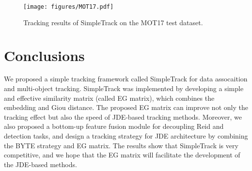 \documentclass[runningheads]{llncs}
\begin{document}
\begin{figure}
\centering
\texttt{[image: figures/MOT17.pdf]}
\caption{Tracking results of SimpleTrack on the MOT17 test dataset.}
\label{fig:MOT17}
\end{figure}
\section{Conclusions}
We proposed a simple tracking framework called SimpleTrack for data assocaition and multi-object tracking. SimpleTrack was implemented by developing a simple and effective similarity matrix (called EG matrix), which combines the embedding and Giou distance. The proposed EG matrix can improve not only the tracking effect but also the speed of JDE-based tracking methods. Moreover, we also proposed a bottom-up feature fusion module for decoupling Reid and detection tasks, and design a tracking strategy for JDE architecture by combining the BYTE strategy and EG matrix. The results show that SimpleTrack is very competitive, and we hope that the EG matrix will facilitate the development of the JDE-based methods.
\end{document}
